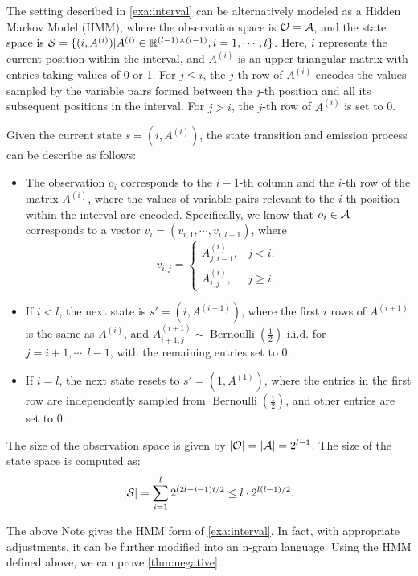 \begin{note}
\label{note:hmm_eg}
The setting described in \cref{exa:interval} can be alternatively modeled as a Hidden Markov Model (HMM), where the observation space is ${\mathcal{O}}={\mathcal{A}}$, and the state space is ${\mathcal{S}}=\{(i,A^{(i)})|A^{(i)}\in\mathbb{R}^{(l-1)\times(l-1)},i=1,\cdots,l\}$. Here, $i$ represents the current position within the interval, and $A^{(i)}$ is an upper triangular matrix with entries taking values of 0 or 1. For $j\leq i$, the $j$-th row of $A^{(i)}$ encodes the values sampled by the variable pairs formed between the $j$-th position and all its subsequent positions in the interval. For $j>i$, the $j$-th row of $A^{(i)}$ is set to 0.

Given the current state $s=(i,A^{(i)})$, the state transition and emission process can be describe as follows:
\begin{itemize}
    \item The observation $o_i$ corresponds to the $i-1$-th column and the $i$-th row of the matrix $A^{(i)}$, where the values of variable pairs relevant to the $i$-th position within the interval are encoded. Specifically, we know that $o_i\in{\mathcal{A}}$ corresponds to a vector $v_i=(v_{i,1},\cdots,v_{i,l-1})$, where $$v_{i,j}=\begin{cases}
        A^{(i)}_{j,i-1}, &j<i,\\
        A^{(i)}_{i,j}, &j\geq i.
    \end{cases}$$
    \item If $i<l$, the next state is $s'=(i,A^{(i+1)})$, where the first $i$ rows of $A^{(i+1)}$ is the same as $A^{(i)}$, and $A^{(i+1)}_{i+1,j}\sim\operatorname{Bernoulli}(\frac{1}{2}) \text{ i.i.d.}$ for $j=i+1,\cdots,l-1$, with the remaining entries set to 0.
    \item If $i=l$, the next state resets to $s'=(1,A^{(1)})$, where the entries in the first row are independently sampled from $\operatorname{Bernoulli}(\frac{1}{2})$, and other entries are set to 0.
\end{itemize}
The size of the observation space is given by $|{\mathcal{O}}|=|{\mathcal{A}}|=2^{l-1}$. The size of the state space is computed as: $$|{\mathcal{S}}|=\sum_{i=1}^{l}2^{(2l-i-1)i/2}\leq l\cdot 2^{l(l-1)/2}.$$
\end{note}

The above Note gives the HMM form of \cref{exa:interval}. In fact, with appropriate adjustments, it can be further modified into an n-gram language. Using the HMM defined above, we can prove \cref{thm:negative}.

